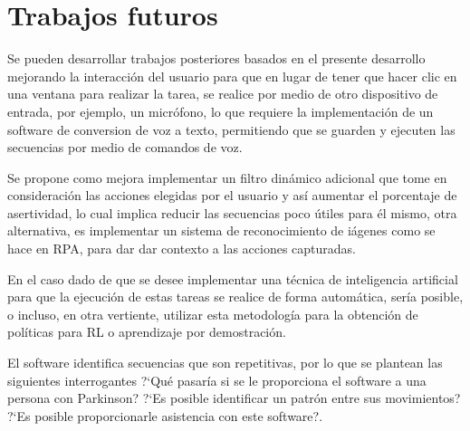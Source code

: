\section{Trabajos futuros}


Se pueden desarrollar trabajos posteriores basados en el presente desarrollo
 mejorando la interacci\'on del usuario para que en lugar de tener que hacer 
 clic en una ventana para realizar la tarea, se realice por medio de otro 
 dispositivo de entrada, por ejemplo, un micr\'ofono, lo que requiere la 
 implementaci\'on de un software de conversion de voz a texto, permitiendo que 
 se guarden y ejecuten las secuencias por medio de comandos de voz. 
 

Se propone como mejora implementar un filtro din\'amico adicional que tome en 
 consideraci\'on las acciones elegidas por el usuario y as\'i aumentar el 
 porcentaje de asertividad, lo cual implica reducir las secuencias poco
  \'utiles para \'el mismo, otra alternativa, es implementar un sistema de
 reconocimiento de i\'agenes como se hace en RPA, para dar dar contexto a las 
 acciones capturadas. 

 
En el caso dado de que se desee implementar una t\'ecnica de inteligencia  
 artificial para que la ejecuci\'on de estas tareas se realice de forma 
 autom\'atica, ser\'ia posible, o incluso, en otra vertiente, utilizar esta 
 metodolog\'ia para la obtenci\'on de pol\'iticas para RL o aprendizaje por 
 demostraci\'on.


El software identifica secuencias que son repetitivas, por lo que se 
 plantean las siguientes interrogantes ?`Qu\'e pasar\'ia si se le 
 proporciona el software a una persona con Parkinson?  
 ?`Es posible identificar un patr\'on entre sus movimientos? 
 ?`Es posible proporcionarle asistencia con este software?.
